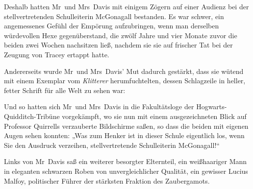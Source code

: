 Deshalb hatten Mr~und Mrs~Davis mit einigem Zögern auf einer Audienz bei der stellvertretenden Schulleiterin McGonagall bestanden. Es war schwer, ein angemessenes Gefühl der Empörung aufzubringen, wenn man derselben würdevollen Hexe gegenüberstand, die zwölf Jahre und vier Monate zuvor die beiden zwei Wochen nachsitzen ließ, nachdem sie sie auf frischer Tat bei der Zeugung von Tracey ertappt hatte.

Andererseits wurde Mr~und Mrs~Davis’ Mut dadurch gestärkt, dass sie wütend mit einem Exemplar vom \emph{Klitterer} herumfuchtelten, dessen Schlagzeile in heller, fetter Schrift für alle Welt zu sehen war:


Und so hatten sich Mr~und Mrs~Davis in die Fakultätsloge der Hogwarts-Quidditch-Tribüne vorgekämpft, wo sie nun mit einem ausgezeichneten Blick auf Professor Quirrells verzauberte Bildschirme saßen, so dass die beiden mit eigenen Augen sehen konnten: „Was zum Henker ist in dieser Schule eigentlich los, wenn Sie den Ausdruck verzeihen, stellvertretende Schulleiterin McGonagall!“

Links von Mr~Davis saß ein weiterer besorgter Elternteil, ein weißhaariger Mann in eleganten schwarzen Roben von unvergleichlicher Qualität, ein gewisser Lucius Malfoy, politischer Führer der stärksten Fraktion des Zaubergamots.

